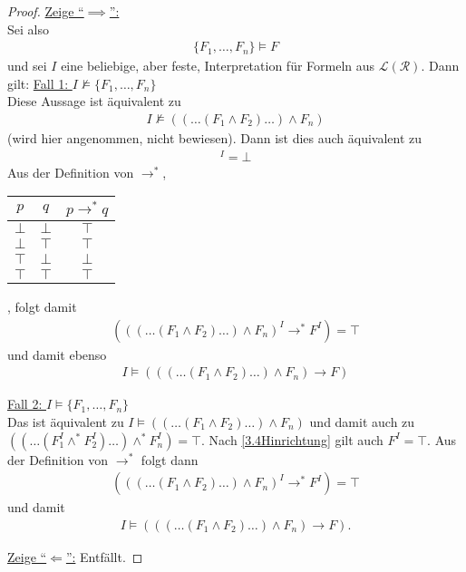 \begin{proof}
	\underline{Zeige ``$\implies$'':}\\
	Sei also 
	\begin{align}\label{3.4Hinrichtung}
		\lbrace F_1,\ldots, F_n\rbrace\models F
	\end{align}
	und sei $I$ eine beliebige, aber feste, Interpretation für Formeln aus $\mathcal{L}(\mathcal{R})$. 
	Dann gilt:\nl
	\underline{Fall 1: $I\not\models\lbrace F_1,\ldots,F_n\rbrace$}\\
	Diese Aussage ist äquivalent zu
	\begin{align*}
		I\not\models((\ldots(F_1\wedge F_2)\ldots)\wedge F_n)
	\end{align*}
	(wird hier angenommen, nicht bewiesen). 
	Dann ist dies auch äquivalent zu 
	\begin{align*}
		[((\ldots(F_1\wedge F_2)\ldots)\wedge F_n)]^I=\bot
	\end{align*}
	Aus der Definition von $\to^\ast$,\\
	\begin{tabular}{c|c||c}
		$p$ & $q$ & $p\to^\ast q$\\ \hline
		$\bot$ & $\bot$ & $\top$\\
		$\bot$ & $\top$ & $\top$\\
		$\top$ & $\bot$ & $\bot$\\
		$\top$ & $\top$ & $\top$
	\end{tabular}, 
	folgt damit
	\begin{align*}
		(((\ldots(F_1\wedge F_2)\ldots)\wedge F_n)^I\to^\ast F^I)=\top
	\end{align*}
	und damit ebenso
	\begin{align*}
		I\models(((\ldots(F_1\wedge F_2)\ldots)\wedge F_n)\to F)
	\end{align*}

	\underline{Fall 2: $I\models\lbrace F_1,\ldots,F_n\rbrace$}\\
	Das ist äquivalent zu $I\models((\ldots(F_1\wedge F_2)\ldots)\wedge F_n)$ und damit auch zu $((\ldots (F_1^I\wedge^\ast F_2^I)\ldots)\wedge^\ast F_n^I)=\top$. 
	Nach \eqref{3.4Hinrichtung} gilt auch $F^I=\top$. 
	Aus der Definition von $\to^\ast$ folgt dann 
	\begin{align*}
		(((\ldots(F_1\wedge F_2)\ldots)\wedge F_n)^I\to^\ast F^I)=\top
	\end{align*}
	und damit
	\begin{align*}
		I\models(((\ldots(F_1\wedge F_2)\ldots)\wedge F_n)\to F).
	\end{align*}

	\underline{Zeige ``$\Longleftarrow$'':} Entfällt.
\end{proof}

